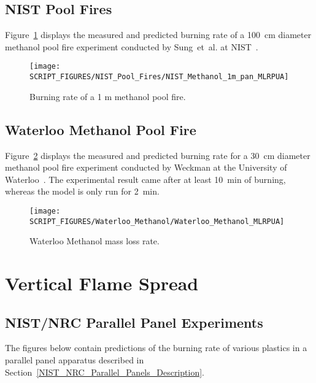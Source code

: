 \FloatBarrier

\subsection{NIST Pool Fires}

Figure~\ref{NIST_1_m_methanol_MLRPUA} displays the measured and predicted burning rate of a 100~cm diameter methanol pool fire experiment conducted by Sung~et~al. at NIST~\cite{Sung:TN2019}.

\begin{figure}[!ht]
\centering
\texttt{[image: SCRIPT\_FIGURES/NIST\_Pool\_Fires/NIST\_Methanol\_1m\_pan\_MLRPUA]}
\caption[NIST 1 m methanol burning rate]{Burning rate of a 1 m methanol pool fire.}
\label{NIST_1_m_methanol_MLRPUA}
\end{figure}

\FloatBarrier

\subsection{Waterloo Methanol Pool Fire}

Figure~\ref{Waterloo_HRR} displays the measured and predicted burning rate for a 30~cm diameter methanol pool fire experiment conducted by Weckman at the University of Waterloo~\cite{Weckman:CF1996}. The experimental result came after at least 10~min of burning, whereas the model is only run for 2~min.

\begin{figure}[!ht]
\centering
\texttt{[image: SCRIPT\_FIGURES/Waterloo\_Methanol/Waterloo\_Methanol\_MLRPUA]}
\caption[Waterloo Methanol mass loss rate]{Waterloo Methanol mass loss rate.}
\label{Waterloo_HRR}
\end{figure}



\clearpage

\section{Vertical Flame Spread}

\subsection{NIST/NRC Parallel Panel Experiments}

The figures below contain predictions of the burning rate of various plastics in a parallel panel apparatus described in Section~\ref{NIST_NRC_Parallel_Panels_Description}.

